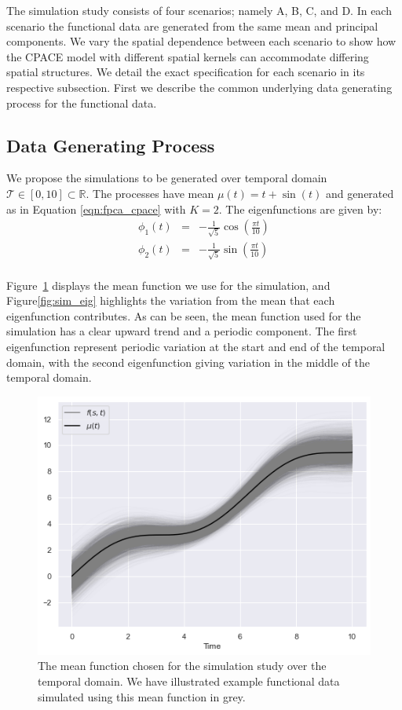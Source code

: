 The simulation study consists of four scenarios; namely A, B, C, and D.
In each scenario the functional data are generated from the same mean and principal components.
We vary the spatial dependence between each scenario to show how the CPACE model with different spatial kernels can accommodate differing spatial structures.
We detail the exact specification for each scenario in its respective subsection.
First we describe the common underlying data generating process for the functional data.

\subsection{Data Generating Process \label{ssec:dgp_sim}}
We propose the simulations to be generated over temporal domain $\mathcal{T} \in \left[0, 10\right] \subset \mathbb{R}$.
The processes have mean $\mu\left(t\right) = t + \sin\left(t\right)$ and generated as in Equation \eqref{eqn:fpca_cpace} with $K=2$.
The eigenfunctions are given by: 
\begin{eqnarray}
	\phi_1\left(t\right) &=& -\frac{1}{\sqrt{5}}\cos\left(\frac{\pi t}{10}\right) \nonumber \\ 
	\phi_2\left(t\right) &=& -\frac{1}{\sqrt{5}}\sin\left(\frac{\pi t}{10}\right) \nonumber \\
\end{eqnarray}

Figure~\ref{fig:sim_mean} displays the mean function we use for the simulation, and Figure\ref{fig:sim_eig} highlights the variation from the mean that each eigenfunction contributes. As can be seen, the mean function used for the simulation has a clear upward trend and a periodic component. The first eigenfunction represent periodic variation at the start and end of the temporal domain, with the second eigenfunction giving variation in the middle of the temporal domain.

\begin{figure}
	\centering
	\includegraphics[width=\textwidth]{mean_sim}
	\caption{The mean function chosen for the simulation study over the temporal domain. We have illustrated example functional data simulated using this mean function in grey.}
	\label{fig:sim_mean}
\end{figure}

